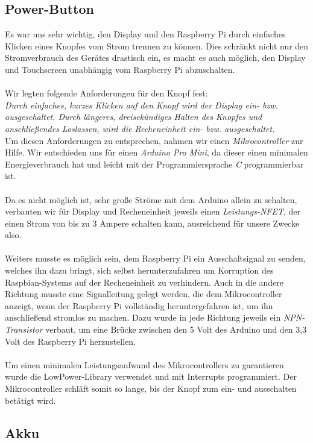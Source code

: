 \subsection{Power-Button}

Es war uns sehr wichtig, den Display und den Raspberry Pi durch einfaches Klicken eines Knopfes vom Strom trennen zu können. Dies schränkt nicht nur den Stromverbrauch des Gerätes drastisch ein, es macht es auch möglich, den Display und Touchscreen unabhängig vom Raspberry Pi abzuschalten.\\
\\
Wir legten folgende Anforderungen für den Knopf fest:\\
\textit{Durch einfaches, kurzes Klicken auf den Knopf wird der Display ein- bzw. ausgeschaltet.
Durch längeres, dreisekündiges Halten des Knopfes und anschließendes Loslassen, wird die Recheneinheit ein- bzw. ausgeschaltet.}
\\
Um diesen Anforderungen zu entsprechen, nahmen wir einen \textit{Mikrocontroller} zur Hilfe. Wir entschieden uns für einen \textit{Arduino Pro Mini}, da dieser einen minimalen Energieverbrauch hat und leicht mit der Programmiersprache \textit{C} programmierbar ist.\\
\\
Da es nicht möglich ist, sehr große Ströme mit dem Arduino allein zu schalten, verbauten wir für Display und Recheneinheit jeweils einen \textit{Leistungs-NFET}, der einen Strom von bis zu 3 Ampere schalten kann, ausreichend für unsere Zwecke also.\\
\\
Weiters musste es möglich sein, dem Raspberry Pi ein Ausschaltsignal zu senden, welches ihn dazu bringt, sich selbst herunterzufahren um Korruption des Raspbian-Systems auf der Recheneinheit zu verhindern. Auch in die andere Richtung musste eine Signalleitung gelegt werden, die dem Mikrocontroller anzeigt, wenn der Raspberry Pi vollständig heruntergefahren ist, um ihn anschließend stromlos zu machen. Dazu wurde in jede Richtung jeweils ein \textit{NPN-Transistor} verbaut, um eine Brücke zwischen den 5 Volt des Arduino und den 3,3 Volt des Raspberry Pi herzustellen.\\
\\
Um einen minimalen Leistungsaufwand des Mikrocontrollers zu garantieren wurde die LowPower-Library verwendet und mit Interrupts programmiert. Der Mikrocontroller schläft somit so lange, bis der Knopf zum ein- und ausschalten betätigt wird.

\subsection{Akku}

